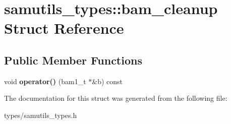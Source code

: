 \hypertarget{structsamutils__types_1_1bam__cleanup}{
\section{samutils\_\-types::bam\_\-cleanup Struct Reference}
\label{structsamutils__types_1_1bam__cleanup}
}
\subsection*{Public Member Functions}
\begin{DoxyCompactItemize}
\item 
\hypertarget{structsamutils__types_1_1bam__cleanup_a5a5d976e1ae4c8a6e70454ad336cff0d}{
void {\bfseries operator()} (bam1\_\-t $\ast$\&b) const }
\label{structsamutils__types_1_1bam__cleanup_a5a5d976e1ae4c8a6e70454ad336cff0d}

\end{DoxyCompactItemize}


The documentation for this struct was generated from the following file:\begin{DoxyCompactItemize}
\item 
types/samutils\_\-types.h\end{DoxyCompactItemize}
